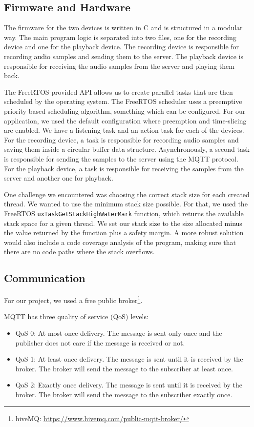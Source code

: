 \documentclass[conference]{IEEEtran}
\begin{document}
\subsection{Firmware and Hardware}

The firmware for the two devices is written in C and is structured in a modular way.
The main program logic is separated into two files, one for the recording device and one for the playback device.
The recording device is responsible for recording audio samples and sending them to the server.
The playback device is responsible for receiving the audio samples from the server and playing them back.

The FreeRTOS-provided API allows us to create parallel tasks that are then scheduled by the operating system.
The FreeRTOS scheduler uses a preemptive priority-based scheduling algorithm\cite{FreeRTOS_Scheduling}, something which can be configured.
For our application, we used the default configuration where preemption and time-slicing are enabled.
We have a listening task and an action task for each of the devices.
For the recording device, a task is responsible for recording audio samples and saving them 
inside a circular buffer data structure. Asynchronously, a second task is responsible for
sending the samples to the server using the MQTT protocol.
For the playback device, a task is responsible for receiving the samples from the server
and another one for playback.

One challenge we encountered was choosing the correct stack size for each created thread.
We wanted to use the minimum stack size possible.
For that, we used the FreeRTOS \texttt{uxTaskGetStackHighWaterMark} function, which returns
the available stack space for a given thread.
We set our stack size to the size allocated minus the value returned by the function plus a safety margin.
A more robust solution would also include a code coverage analysis\cite{CodeCoverage} of the program,
making sure that there are no code paths where the stack overflows.

\subsection{Communication}

For our project, we used a free public broker\footnote{hiveMQ: \url{https://www.hivemq.com/public-mqtt-broker/}}.

MQTT has three quality of service (QoS) levels:

\begin{itemize}
    \item QoS 0: At most once delivery. The message is sent only once and the publisher does not care if the message is received or not.
    \item QoS 1: At least once delivery. The message is sent until it is received by the broker. The broker will send the message to the subscriber at least once.
    \item QoS 2: Exactly once delivery. The message is sent until it is received by the broker. The broker will send the message to the subscriber exactly once.
\end{itemize}
\end{document}
